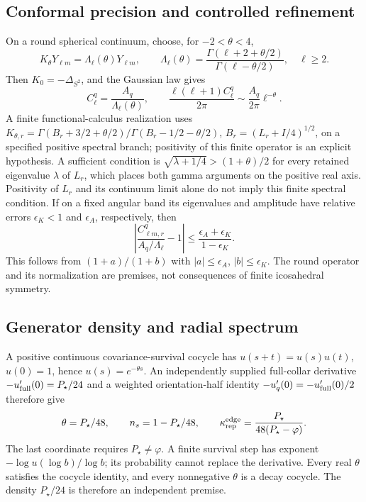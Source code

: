 \documentclass[11pt]{article}
\theoremstyle{remark}
\theoremstyle{plain}
\begin{document}
\subsection{Conformal precision and controlled refinement}
\label{def:oph-screen-conformal-precision}
On a round spherical continuum, choose, for \(-2<\theta<4\),
\[
 K_\theta Y_{\ell m}=\Lambda_\ell(\theta)Y_{\ell m},\qquad
 \Lambda_\ell(\theta)=
 \frac{\Gamma(\ell+2+\theta/2)}{\Gamma(\ell-\theta/2)},\quad \ell\ge2.
\]
Then \(K_0=-\Delta_{S^2}\), and the Gaussian law gives
\[
 C_\ell^q=\frac{A_q}{\Lambda_\ell(\theta)},\qquad
 \frac{\ell(\ell+1)C_\ell^q}{2\pi}\sim\frac{A_q}{2\pi}\ell^{-\theta}.
\]
A finite functional-calculus realization uses
\(K_{\theta,r}=\Gamma(B_r+3/2+\theta/2)/
\Gamma(B_r-1/2-\theta/2)\), \(B_r=(L_r+I/4)^{1/2}\), on a specified
positive spectral branch; positivity of this finite operator is an explicit
hypothesis. A sufficient condition is
\(\sqrt{\lambda+1/4}>(1+\theta)/2\) for every retained eigenvalue
\(\lambda\) of \(L_r\), which places both gamma arguments on the positive
real axis. Positivity of \(L_r\) and its continuum limit alone do not
imply this finite spectral condition. If on a fixed angular band its eigenvalues and amplitude have
relative errors \(\epsilon_K<1\) and \(\epsilon_A\), respectively, then
\[
 \left|\frac{C_{\ell m,r}^q}{A_q/\Lambda_\ell}-1\right|
 \le\frac{\epsilon_A+\epsilon_K}{1-\epsilon_K}.
\]
This follows from \((1+a)/(1+b)\) with
\(|a|\le\epsilon_A\), \(|b|\le\epsilon_K\). The round operator and its
normalization are premises, not consequences of finite icosahedral symmetry.

\subsection{Generator density and radial spectrum}
A positive continuous covariance-survival cocycle has
\(u(s+t)=u(s)u(t)\), \(u(0)=1\), hence \(u(s)=e^{-\theta s}\).
An independently supplied full-collar derivative
\(-u'_{\rm full}(0)=P_\star/24\) and a weighted orientation-half identity
\(-u'_q(0)=-u'_{\rm full}(0)/2\) therefore give
\[
 \theta=P_\star/48,\qquad n_s=1-P_\star/48,\qquad
 \kappa_{\rm rep}^{\rm edge}=\frac{P_\star}{48(P_\star-\varphi)}.
\]
The last coordinate requires \(P_\star\ne\varphi\). A finite survival
step has exponent \(-\log u(\log b)/\log b\); its probability cannot
replace the derivative. Every real \(\theta\) satisfies the cocycle
identity, and every nonnegative \(\theta\) is a decay cocycle. The density
\(P_\star/24\) is therefore an independent premise.
\end{document}
